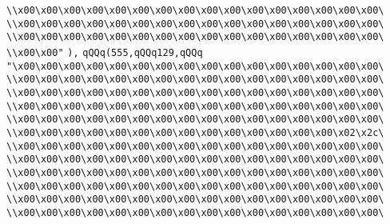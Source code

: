 \verb|\\x00\x00\x00\x00\x00\x00\x00\x00\x00\x00\x00\x00\x00\x00\x00\x00\|\newline
\verb|\\x00\x00\x00\x00\x00\x00\x00\x00\x00\x00\x00\x00\x00\x00\x00\x00\|\newline
\verb|\\x00\x00\x00\x00\x00\x00\x00\x00\x00\x00\x00\x00\x00\x00\x00\x00\|\newline
\verb|\\x00\x00"|\newline
\verb|),|\newline
\verb|qQQq(555,qQQq129,qQQq|\newline
\verb|"\x00\x00\x00\x00\x00\x00\x00\x00\x00\x00\x00\x00\x00\x00\x00\x00\|\newline
\verb|\\x00\x00\x00\x00\x00\x00\x00\x00\x00\x00\x00\x00\x00\x00\x00\x00\|\newline
\verb|\\x00\x00\x00\x00\x00\x00\x00\x00\x00\x00\x00\x00\x00\x00\x00\x00\|\newline
\verb|\\x00\x00\x00\x00\x00\x00\x00\x00\x00\x00\x00\x00\x00\x00\x00\x00\|\newline
\verb|\\x00\x00\x00\x00\x00\x00\x00\x00\x00\x00\x00\x00\x00\x00\x00\x00\|\newline
\verb|\\x00\x00\x00\x00\x00\x00\x00\x00\x00\x00\x00\x00\x00\x00\x02\x2c\|\newline
\verb|\\x00\x00\x00\x00\x00\x00\x00\x00\x00\x00\x00\x00\x00\x00\x00\x00\|\newline
\verb|\\x00\x00\x00\x00\x00\x00\x00\x00\x00\x00\x00\x00\x00\x00\x00\x00\|\newline
\verb|\\x00\x00\x00\x00\x00\x00\x00\x00\x00\x00\x00\x00\x00\x00\x00\x00\|\newline
\verb|\\x00\x00\x00\x00\x00\x00\x00\x00\x00\x00\x00\x00\x00\x00\x00\x00\|\newline
\verb|\\x00\x00\x00\x00\x00\x00\x00\x00\x00\x00\x00\x00\x00\x00\x00\x00\|\newline
\verb|\\x00\x00\x00\x00\x00\x00\x00\x00\x00\x00\x00\x00\x00\x00\x00\x00\|\newline
